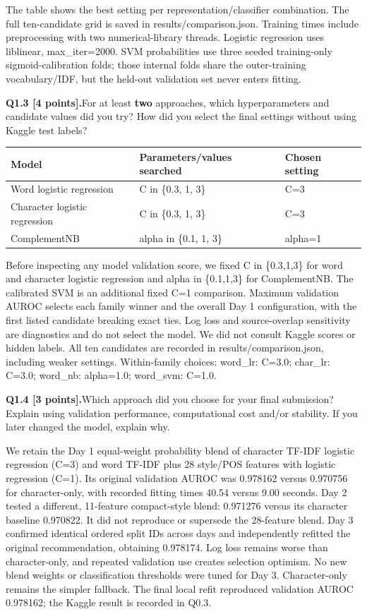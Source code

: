 \documentclass[11pt,letterpaper]{article}
\newcommand{\question}[2]{\needspace{4\baselineskip}\par\addvspace{0.45em}\noindent\textbf{#1}\quad #2\par\nobreak\vspace{0.1em}}
\begin{document}
The table shows the best setting per representation/classifier combination. The full ten-candidate grid is saved in results/comparison.json. Training times include preprocessing with two numerical-library threads. Logistic regression uses liblinear, max\_iter=2000. SVM probabilities use three seeded training-only sigmoid-calibration folds; those internal folds share the outer-training vocabulary/IDF, but the held-out validation set never enters fitting.

\question{Q1.3 [4 points].}{For at least \textbf{two} approaches, which hyperparameters and candidate values did you try? How did you select the final settings without using Kaggle test labels?}

\begin{center}\small\begin{tabular}{p{4.1cm}p{5cm}p{2.8cm}}
\toprule
Model & Parameters/values searched & Chosen setting \\
\midrule
Word logistic regression & C in \{0.3, 1, 3\} & C=3 \\
Character logistic regression & C in \{0.3, 1, 3\} & C=3 \\
ComplementNB & alpha in \{0.1, 1, 3\} & alpha=1 \\
\bottomrule\end{tabular}\end{center}

Before inspecting any model validation score, we fixed C in \{0.3,1,3\} for word and character logistic regression and alpha in \{0.1,1,3\} for ComplementNB. The calibrated SVM is an additional fixed C=1 comparison. Maximum validation AUROC selects each family winner and the overall Day 1 configuration, with the first listed candidate breaking exact ties. Log loss and source-overlap sensitivity are diagnostics and do not select the model. We did not consult Kaggle scores or hidden labels. All ten candidates are recorded in results/comparison.json, including weaker settings. Within-family choices: word\_lr: C=3.0; char\_lr: C=3.0; word\_nb: alpha=1.0; word\_svm: C=1.0.

\question{Q1.4 [3 points].}{Which approach did you choose for your final submission? Explain using validation performance, computational cost and/or stability. If you later changed the model, explain why.}

We retain the Day 1 equal-weight probability blend of character TF-IDF logistic regression (C=3) and word TF-IDF plus 28 style/POS features with logistic regression (C=1). Its original validation AUROC was 0.978162 versus 0.970756 for character-only, with recorded fitting times 40.54 versus 9.00 seconds. Day 2 tested a different, 11-feature compact-style blend: 0.971276 versus its character baseline 0.970822. It did not reproduce or supersede the 28-feature blend. Day 3 confirmed identical ordered split IDs across days and independently refitted the original recommendation, obtaining 0.978174. Log loss remains worse than character-only, and repeated validation use creates selection optimism. No new blend weights or classification thresholds were tuned for Day 3. Character-only remains the simpler fallback. The final local refit reproduced validation AUROC 0.978162; the Kaggle result is recorded in Q0.3.
\end{document}
